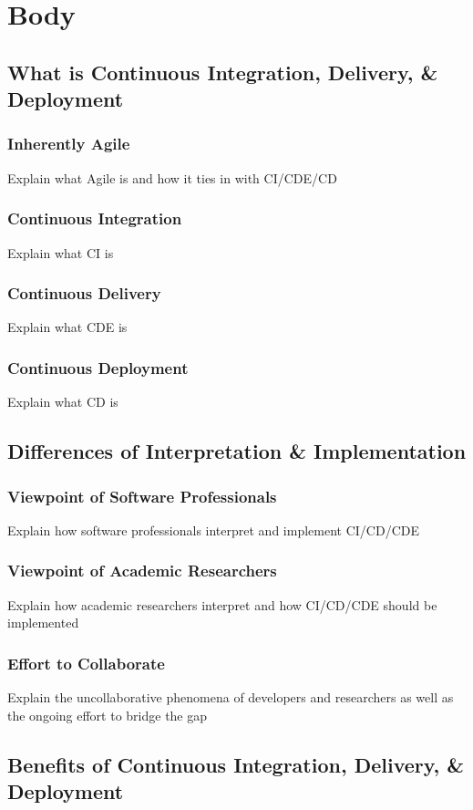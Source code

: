 \documentclass[11pt,a4paper]{article}
\begin{document}
\section{Body}
	\subsection{What is Continuous Integration, Delivery, \& Deployment}
		\subsubsection{Inherently Agile}
		Explain what Agile is and how it ties in with CI/CDE/CD
		\subsubsection{Continuous Integration}
		Explain what CI is
		\subsubsection{Continuous Delivery}
		Explain what CDE is
		\subsubsection{Continuous Deployment}
		Explain what CD is
		
	\subsection{Differences of Interpretation \& Implementation}
		\subsubsection{Viewpoint of Software Professionals}
		Explain how software professionals interpret and implement CI/CD/CDE
		\subsubsection{Viewpoint of Academic Researchers}
		Explain how academic researchers interpret and how CI/CD/CDE should be implemented
		\subsubsection{Effort to Collaborate}
		Explain the uncollaborative phenomena of developers and researchers as well as the ongoing effort to bridge the gap
		
	\subsection{Benefits of Continuous Integration, Delivery, \& Deployment}
\end{document}
